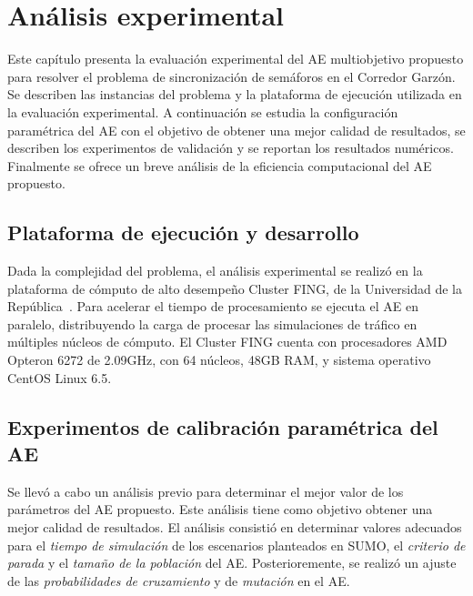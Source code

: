 \chapter{Análisis experimental}
Este capítulo presenta la evaluación experimental del AE multiobjetivo propuesto para resolver el problema de sincronización de semáforos en el Corredor Garzón. Se describen las instancias del problema y la plataforma de ejecución utilizada en la evaluación experimental. A continuación se estudia la configuración paramétrica del AE con el objetivo de obtener una mejor calidad de resultados, se describen los experimentos de validación y se reportan los resultados numéricos. Finalmente se ofrece un breve análisis de la eficiencia computacional del AE propuesto.

\section{Plataforma de ejecución y desarrollo}

Dada la complejidad del problema, el análisis experimental se realizó en la plataforma de cómputo de alto desempeño Cluster FING, de la Universidad de la República~\citep{nesmachnow2010computacion}. Para acelerar el tiempo de procesamiento se ejecuta el AE en paralelo, distribuyendo la carga de procesar las simulaciones de tráfico en múltiples núcleos de cómputo. El Cluster FING cuenta con procesadores AMD Opteron 6272 de 2.09GHz, con 64 núcleos, 48GB RAM, y sistema operativo CentOS Linux 6.5.



\section{Experimentos de calibración paramétrica del AE}
Se llevó a cabo un análisis previo para determinar el mejor valor de los parámetros del AE propuesto. Este análisis tiene como objetivo obtener una mejor calidad de resultados. El análisis consistió en determinar valores adecuados para el \emph{tiempo de simulación} de los escenarios planteados en SUMO, el \emph{criterio de parada} y el \emph{tamaño de la población} del AE. Posterioremente, se realizó un ajuste de las \emph{probabilidades de cruzamiento} y de \emph{mutación} en el AE. 

